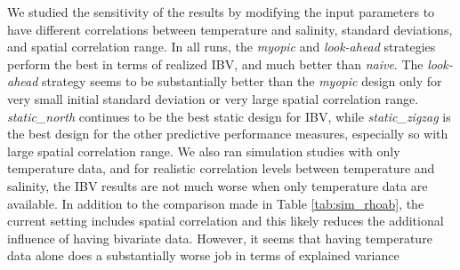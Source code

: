 We studied the sensitivity of the results by modifying the input
parameters to have different correlations between temperature and
salinity, standard deviations, and spatial correlation range.  In all
runs, the \textit{myopic} and \textit{look-ahead} strategies perform
the best in terms of realized IBV, and much better than
\textit{naive}. The \textit{look-ahead} strategy seems to be
substantially better than the \textit{myopic} design only for very
small initial standard deviation or very large spatial correlation
range. \textit{static\_north} continues to be the best static design
for IBV, while \textit{static\_zigzag} is the best design for the
other predictive performance measures, especially so with large
spatial correlation range. We also ran simulation studies with only
temperature data, and for realistic correlation levels between
temperature and salinity, the IBV results are not much worse when only
temperature data are available. In addition to the comparison made in
Table \ref{tab:sim_rhoab}, the current setting includes spatial
correlation and this likely reduces the additional influence of having
bivariate data. However, it seems that having temperature data alone
does a substantially worse job in terms of explained variance